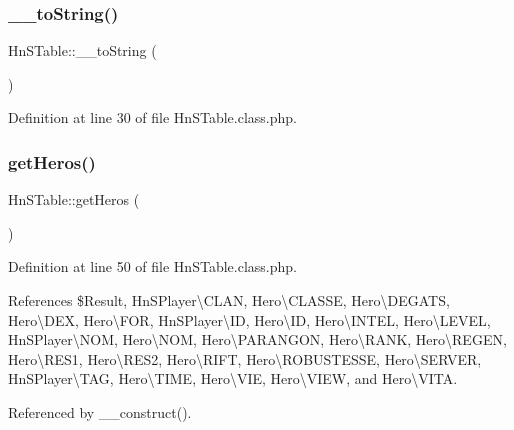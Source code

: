 \subsubsection{\texorpdfstring{\+\_\+\+\_\+to\+String()}{\_\_toString()}}
{\footnotesize\ttfamily Hn\+S\+Table\+::\+\_\+\+\_\+to\+String (\begin{DoxyParamCaption}{ }\end{DoxyParamCaption})}



Definition at line 30 of file Hn\+S\+Table.\+class.\+php.

\mbox{\label{class_hn_s_table_a033a22727cb8e44dd8d8d874482d2258}} 
\subsubsection{\texorpdfstring{get\+Heros()}{getHeros()}}
{\footnotesize\ttfamily Hn\+S\+Table\+::get\+Heros (\begin{DoxyParamCaption}{ }\end{DoxyParamCaption})\hspace{0.3cm}{\ttfamily [protected]}}



Definition at line 50 of file Hn\+S\+Table.\+class.\+php.



References \$\+Result, Hn\+S\+Player\textbackslash{}\+C\+L\+AN, Hero\textbackslash{}\+C\+L\+A\+S\+SE, Hero\textbackslash{}\+D\+E\+G\+A\+TS, Hero\textbackslash{}\+D\+EX, Hero\textbackslash{}\+F\+OR, Hn\+S\+Player\textbackslash{}\+ID, Hero\textbackslash{}\+ID, Hero\textbackslash{}\+I\+N\+T\+EL, Hero\textbackslash{}\+L\+E\+V\+EL, Hn\+S\+Player\textbackslash{}\+N\+OM, Hero\textbackslash{}\+N\+OM, Hero\textbackslash{}\+P\+A\+R\+A\+N\+G\+ON, Hero\textbackslash{}\+R\+A\+NK, Hero\textbackslash{}\+R\+E\+G\+EN, Hero\textbackslash{}\+R\+E\+S1, Hero\textbackslash{}\+R\+E\+S2, Hero\textbackslash{}\+R\+I\+FT, Hero\textbackslash{}\+R\+O\+B\+U\+S\+T\+E\+S\+SE, Hero\textbackslash{}\+S\+E\+R\+V\+ER, Hn\+S\+Player\textbackslash{}\+T\+AG, Hero\textbackslash{}\+T\+I\+ME, Hero\textbackslash{}\+V\+IE, Hero\textbackslash{}\+V\+I\+EW, and Hero\textbackslash{}\+V\+I\+TA.



Referenced by \+\_\+\+\_\+construct().

